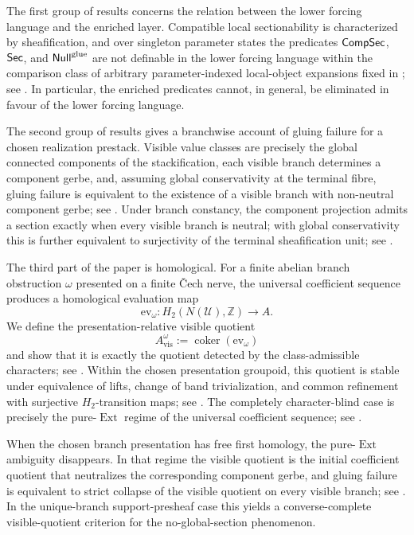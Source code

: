 The first group of results concerns the relation between the lower forcing language and the enriched layer. Compatible local sectionability is characterized by sheafification, and over singleton parameter states the predicates $\mathsf{CompSec}$, $\mathsf{Sec}$, and $\mathsf{Null}^{\mathrm{glue}}$ are not definable in the lower forcing language within the comparison class of arbitrary parameter-indexed local-object expansions fixed in ; see . In particular, the enriched predicates cannot, in general, be eliminated in favour of the lower forcing language.

The second group of results gives a branchwise account of gluing failure for a chosen realization prestack. Visible value classes are precisely the global connected components of the stackification, each visible branch determines a component gerbe, and, assuming global conservativity at the terminal fibre, gluing failure is equivalent to the existence of a visible branch with non-neutral component gerbe; see . Under branch constancy, the component projection admits a section exactly when every visible branch is neutral; with global conservativity this is further equivalent to surjectivity of the terminal sheafification unit; see .

The third part of the paper is homological. For a finite abelian branch obstruction $\omega$ presented on a finite \v{C}ech nerve, the universal coefficient sequence produces a homological evaluation map
\[
\mathrm{ev}_{\omega}:H_2(N(\mathcal U),\mathbb Z)\to A.
\]
We define the presentation-relative visible quotient
\[
A_{\mathrm{vis}}^{\omega}:=\operatorname{coker}(\mathrm{ev}_{\omega})
\]
and show that it is exactly the quotient detected by the class-admissible characters; see . Within the chosen presentation groupoid, this quotient is stable under equivalence of lifts, change of band trivialization, and common refinement with surjective $H_2$-transition maps; see . The completely character-blind case is precisely the pure-$\operatorname{Ext}$ regime of the universal coefficient sequence; see .

When the chosen branch presentation has free first homology, the pure-$\operatorname{Ext}$ ambiguity disappears. In that regime the visible quotient is the initial coefficient quotient that neutralizes the corresponding component gerbe, and gluing failure is equivalent to strict collapse of the visible quotient on every visible branch; see . In the unique-branch support-presheaf case this yields a converse-complete visible-quotient criterion for the no-global-section phenomenon.

